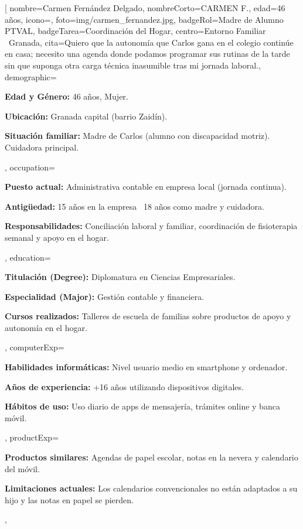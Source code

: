 \documentclass[10pt]{article}
\begin{document}
\fichaAdulto[%
    nombre={Carmen Fernández Delgado},
    nombreCorto={CARMEN F.},
    edad={46 años},
    icono={\faUserNurse},
    foto={img/carmen_fernandez.jpg},
    badgeRol={Madre de Alumno PTVAL},
    badgeTarea={Coordinación del Hogar},
    centro={Entorno Familiar \textbar\ Granada},
    cita={Quiero que la autonomía que Carlos gana en el colegio continúe en casa; necesito una agenda donde podamos programar sus rutinas de la tarde sin que suponga otra carga técnica inasumible tras mi jornada laboral.},
    demographic={%
        \item \textbf{Edad y Género:} 46 años, Mujer.
        \item \textbf{Ubicación:} Granada capital (barrio Zaidín).
        \item \textbf{Situación familiar:} Madre de Carlos (alumno con discapacidad motriz). Cuidadora principal.
    },
    occupation={%
        \item \textbf{Puesto actual:} Administrativa contable en empresa local (jornada continua).
        \item \textbf{Antigüedad:} 15 años en la empresa \textbar\ 18 años como madre y cuidadora.
        \item \textbf{Responsabilidades:} Conciliación laboral y familiar, coordinación de fisioterapia semanal y apoyo en el hogar.
    },
    education={%
        \item \textbf{Titulación (Degree):} Diplomatura en Ciencias Empresariales.
        \item \textbf{Especialidad (Major):} Gestión contable y financiera.
        \item \textbf{Cursos realizados:} Talleres de escuela de familias sobre productos de apoyo y autonomía en el hogar.
    },
    computerExp={%
        \item \textbf{Habilidades informáticas:} Nivel usuario medio en smartphone y ordenador.
        \item \textbf{Años de experiencia:} +16 años utilizando dispositivos digitales.
        \item \textbf{Hábitos de uso:} Uso diario de apps de mensajería, trámites online y banca móvil.
    },
    productExp={%
        \item \textbf{Productos similares:} Agendas de papel escolar, notas en la nevera y calendario del móvil.
        \item \textbf{Limitaciones actuales:} Los calendarios convencionales no están adaptados a su hijo y las notas en papel se pierden.
    },
\end{document}
